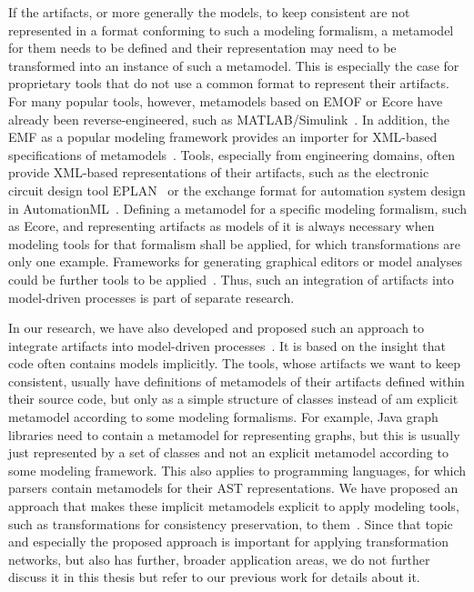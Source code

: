 If the artifacts, or more generally the models, to keep consistent are not represented in a format conforming to such a modeling formalism, a metamodel for them needs to be defined and their representation may need to be transformed into an instance of such a metamodel.
This is especially the case for proprietary tools that do not use a common format to represent their artifacts.
For many popular tools, however, metamodels based on \gls{EMOF} or Ecore have already been reverse-engineered, such as 
MATLAB/Simulink~\cite{heinzemann2013Reconfiguration-CBSE,son2012Simulink-CAGGIE,armengaud2011Safety-WCE}.
In addition, the \gls{EMF} as a popular modeling framework provides an importer for XML-based specifications of metamodels~\cite[pp.~86]{steinberg2009emf}.
Tools, especially from engineering domains, often provide XML-based representations of their artifacts, such as the electronic circuit design tool EPLAN~\cite{eplan} or the exchange format for automation system design in AutomationML~\cite{automationML}.
Defining a metamodel for a specific modeling formalism, such as Ecore, and representing artifacts as models of it is always necessary when modeling tools for that formalism shall be applied, for which transformations are only one example.
Frameworks for generating graphical editors or model analyses could be further tools to be applied~.
Thus, such an integration of artifacts into model-driven processes is part of separate research.

In our research, we have also developed and proposed such an approach to integrate artifacts into model-driven processes~.
It is based on the insight that code often contains models implicitly.
The tools, whose artifacts we want to keep consistent, usually have definitions of metamodels of their artifacts defined within their source code, but only as a simple structure of classes instead of am explicit metamodel according to some modeling formalisms.
For example, Java graph libraries need to contain a metamodel for representing graphs, but this is usually just represented by a set of classes and not an explicit metamodel according to some modeling framework.
This also applies to programming languages, for which parsers contain metamodels for their \gls{AST} representations.
We have proposed an approach that makes these implicit metamodels explicit to apply modeling tools, such as transformations for consistency preservation, to them~.
Since that topic and especially the proposed approach is important for applying transformation networks, but also has further, broader application areas, we do not further discuss it in this thesis but refer to our previous work for details about it.


